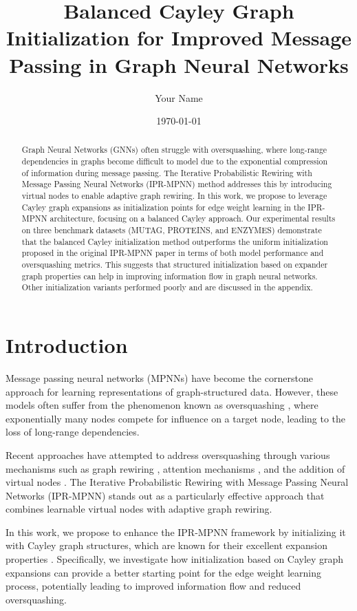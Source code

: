 \documentclass[11pt,a4paper]{article}
\title{Balanced Cayley Graph Initialization for Improved Message Passing in Graph Neural Networks}
\author{Your Name}
\date{\today}
\begin{document}
\maketitle

\begin{abstract}
Graph Neural Networks (GNNs) often struggle with oversquashing, where long-range dependencies in graphs become difficult to model due to the exponential compression of information during message passing. The Iterative Probabilistic Rewiring with Message Passing Neural Networks (IPR-MPNN) method addresses this by introducing virtual nodes to enable adaptive graph rewiring. In this work, we propose to leverage Cayley graph expansions as initialization points for edge weight learning in the IPR-MPNN architecture, focusing on a balanced Cayley approach. Our experimental results on three benchmark datasets (MUTAG, PROTEINS, and ENZYMES) demonstrate that the balanced Cayley initialization method outperforms the uniform initialization proposed in the original IPR-MPNN paper in terms of both model performance and oversquashing metrics. This suggests that structured initialization based on expander graph properties can help in improving information flow in graph neural networks. Other initialization variants performed poorly and are discussed in the appendix.
\end{abstract}

\section{Introduction}
Message passing neural networks (MPNNs) \cite{gilmer2017neural} have become the cornerstone approach for learning representations of graph-structured data. However, these models often suffer from the phenomenon known as oversquashing \cite{alon2021bottleneck}, where exponentially many nodes compete for influence on a target node, leading to the loss of long-range dependencies.

Recent approaches have attempted to address oversquashing through various mechanisms such as graph rewiring \cite{topping2022understanding}, attention mechanisms \cite{veličković2018graph}, and the addition of virtual nodes \cite{gilmer2017neural}. The Iterative Probabilistic Rewiring with Message Passing Neural Networks (IPR-MPNN) \cite{tang2022iprmpnn} stands out as a particularly effective approach that combines learnable virtual nodes with adaptive graph rewiring.

In this work, we propose to enhance the IPR-MPNN framework by initializing it with Cayley graph structures, which are known for their excellent expansion properties \cite{lubotzky1988ramanujan}. Specifically, we investigate how initialization based on Cayley graph expansions can provide a better starting point for the edge weight learning process, potentially leading to improved information flow and reduced oversquashing.
\end{document}
